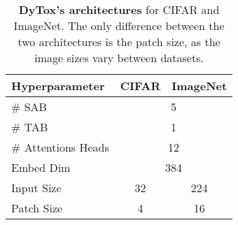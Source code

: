 \begin{table}[t]
    \centering
    \begin{tabular}{@{}l|cc@{}}
        \hline
        Hyperparameter      & CIFAR                   & ImageNet \Tstrut\Bstrut \\
        \hline
        \# SAB              & \multicolumn{2}{c}{5}                             \\
        \# TAB              & \multicolumn{2}{c}{1}                             \\
        \# Attentions Heads & \multicolumn{2}{c}{12}                            \\
        Embed Dim           & \multicolumn{2}{c}{384}                           \\
        Input Size          & 32                      & 224                     \\
        Patch Size          & 4                       & 16                      \\
        \hline
    \end{tabular}
    \caption{\textbf{DyTox's architectures} for CIFAR and ImageNet. The only difference between the
        two architectures is the patch size, as the image sizes vary between datasets.}
    \label{tab:dytox_archi}
\end{table}
